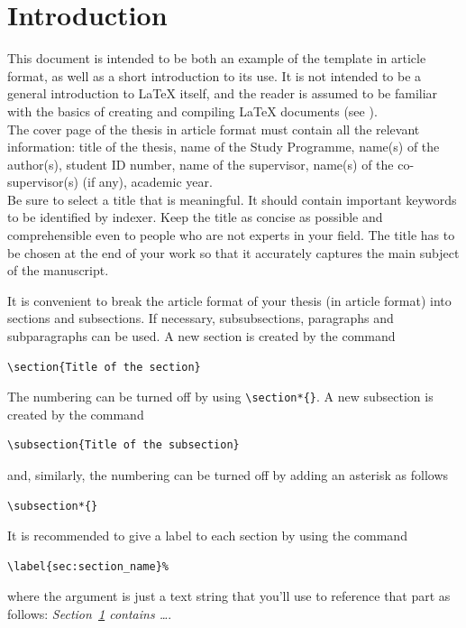 \documentclass[11pt,a4paper]{article}
\begin{document}

\section{Introduction}
\label{sec:introduction}
This document is intended to be both an example of the template in article format,
as well as a short introduction to its use. It is not intended to be a general introduction to \LaTeX{} itself,
and the reader is assumed to be familiar with the basics of creating and compiling \LaTeX{} documents (see \cite{oetiker1995not, kottwitz2015latex}). 
\\
The cover page of the thesis in article format must contain all the relevant information:
title of the thesis, name of the Study Programme, name(s) of the author(s),
student ID number, name of the supervisor, name(s) of the co-supervisor(s) (if any), academic year.
\\
Be sure to select a title that is meaningful.
It should contain important keywords to be identified by indexer.
Keep the title as concise as possible and comprehensible even to people who are not experts in your field.
The title has to be chosen at the end of your work so that it accurately captures the main subject of the manuscript.

It is convenient to break the article format of your thesis (in article format) into sections and subsections. 
If necessary, subsubsections, paragraphs and subparagraphs can be used. 
A new section is created by the command
\begin{verbatim}
\section{Title of the section}
\end{verbatim}
The numbering can be turned off by using \verb|\section*{}|.
A new subsection is created by the command
\begin{verbatim}
\subsection{Title of the subsection}
\end{verbatim}
and, similarly, the numbering can be turned off by adding an asterisk as follows 
\begin{verbatim}
\subsection*{}
\end{verbatim}
It is recommended to give a label to each section by using the command
\begin{verbatim}
\label{sec:section_name}%
\end{verbatim}
where the argument is just a text string that you'll use to reference that part
as follows: \textit{Section~\ref{sec:introduction} contains   \dots}.
\end{document}
